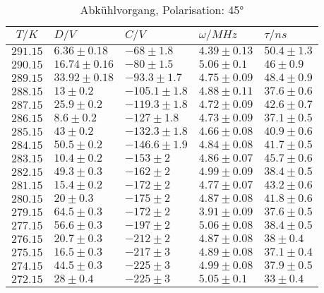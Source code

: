 \begin{table}[h!]
\scriptsize\centering
\begin{tabular}{|c|l|l|l|l|}
\hline
$T/K$&$D/V$&$C/V$&$\omega/MHz$&$\tau/ns$\\\hline\hline
$291.15$&$6.36\pm0.18$&$-68\pm1.8$&$4.39\pm0.13$&$50.4\pm1.3$\\\hline
$290.15$&$16.74\pm0.16$&$-80\pm1.5$&$5.06\pm0.1$&$46\pm0.9$\\\hline
$289.15$&$33.92\pm0.18$&$-93.3\pm1.7$&$4.75\pm0.09$&$48.4\pm0.9$\\\hline
$288.15$&$13\pm0.2$&$-105.1\pm1.8$&$4.88\pm0.11$&$37.6\pm0.6$\\\hline
$287.15$&$25.9\pm0.2$&$-119.3\pm1.8$&$4.72\pm0.09$&$42.6\pm0.7$\\\hline
$286.15$&$8.6\pm0.2$&$-127\pm1.8$&$4.73\pm0.09$&$37.1\pm0.5$\\\hline
$285.15$&$43\pm0.2$&$-132.3\pm1.8$&$4.66\pm0.08$&$40.9\pm0.6$\\\hline
$284.15$&$50.5\pm0.2$&$-146.6\pm1.9$&$4.84\pm0.08$&$41.7\pm0.5$\\\hline
$283.15$&$10.4\pm0.2$&$-153\pm2$&$4.86\pm0.07$&$45.7\pm0.6$\\\hline
$282.15$&$49.3\pm0.3$&$-162\pm2$&$4.99\pm0.09$&$38.4\pm0.5$\\\hline
$281.15$&$15.4\pm0.2$&$-172\pm2$&$4.77\pm0.07$&$43.2\pm0.6$\\\hline
$280.15$&$20\pm0.3$&$-175\pm2$&$4.87\pm0.08$&$41.8\pm0.6$\\\hline
$279.15$&$64.5\pm0.3$&$-172\pm2$&$3.91\pm0.09$&$37.6\pm0.5$\\\hline
$277.15$&$56.6\pm0.3$&$-197\pm2$&$5.06\pm0.08$&$38.4\pm0.5$\\\hline
$276.15$&$20.7\pm0.3$&$-212\pm2$&$4.87\pm0.08$&$38\pm0.4$\\\hline
$275.15$&$16.5\pm0.3$&$-217\pm3$&$4.89\pm0.08$&$37.1\pm0.4$\\\hline
$274.15$&$44.5\pm0.3$&$-225\pm3$&$4.99\pm0.08$&$37.9\pm0.5$\\\hline
$272.15$&$28\pm0.4$&$-225\pm3$&$5.05\pm0.1$&$33\pm0.4$\\\hline
\end{tabular}
\caption{Abkühlvorgang, Polarisation: 45°\label{cold45}}
\end{table}
